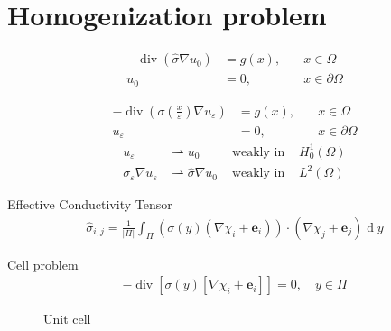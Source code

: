 \documentclass[10pt]{beamer}	%
\begin{document}
\section{Homogenization problem}
\begin{frame}
\begin{align}
-\operatorname{div} (\hat \sigma \nabla u_0) &= g(x), \quad &x \in \Omega \\
u_0 &=0, \quad &x \in \partial \Omega
\end{align}
\end{frame}
\begin{frame}
\begin{align*}
-\operatorname{div} (\sigma(\frac{x}{\varepsilon}) \nabla u_{\varepsilon}) &= g(x) , \quad & x \in \Omega\\
u_{\varepsilon} &= 0, \quad &x \in \partial \Omega
\end{align*}
\begin{align*}
u_{\varepsilon} &\rightharpoonup u_0 &\text{ weakly in } &H^1_0(\Omega)\\
\sigma_{\varepsilon}\nabla u_{\varepsilon} &\rightharpoonup \hat \sigma \nabla u_0 &\text{ weakly in } &L^2(\Omega)
\end{align*}
\end{frame}

\begin{frame}{Effective Conductivity Tensor}
\begin{align*}
\hat \sigma_{i,j} = \frac{1}{|\Pi|} \int_{\Pi} (\sigma(y)(\nabla \chi_i + \boldsymbol e_i)) \cdot (\nabla \chi_j + \boldsymbol e_j) \operatorname d y
\end{align*}
\end{frame}

\begin{frame}{Cell problem}
\begin{align}
- \operatorname{div} \left[ \sigma(y)[\nabla \chi_i + \boldsymbol e_i ]\right] = 0 , \quad y \in \Pi
\end{align}
\begin{figure}
\caption{Unit cell}
\end{figure}
\end{frame}
%
\end{document}
